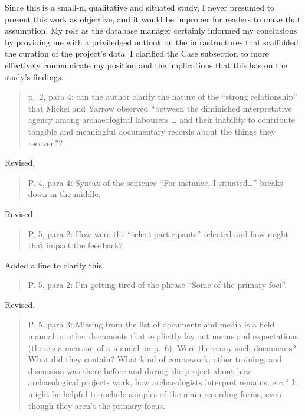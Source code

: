 \documentclass[
]{article}
\begin{document}
Since this is a small-n, qualitative and situated study, I never
presumed to present this work as objective, and it would be improper for
readers to make that assumption. My role as the database manager
certainly informed my conclusions by providing me with a priviledged
outlook on the infrastructures that scaffolded the curation of the
project's data. I clarified the Case subsection to more effectively
communicate my position and the implications that this has on the
study's findings.

\begin{quote}
p.~2, para 4: can the author clarify the nature of the ``strong
relationship'' that Mickel and Yarrow observed ``between the diminished
interpretative agency among archaeological labourers \ldots{} and their
inability to contribute tangible and meaningful documentary records
about the things they recover.''?
\end{quote}

Revised.

\begin{quote}
P. 4, para 4: Syntax of the sentence ``For instance, I
situated\ldots{}'' breaks down in the middle.
\end{quote}

Revised.

\begin{quote}
P. 5, para 2: How were the ``select participants'' selected and how
might that impact the feedback?
\end{quote}

Added a line to clarify this.

\begin{quote}
P. 5, para 2: I'm getting tired of the phrase ``Some of the primary
foci''.
\end{quote}

Revised.

\begin{quote}
P. 5, para 3: Missing from the list of documents and media is a field
manual or other documents that explicitly lay out norms and expectations
(there's a mention of a manual on p.~6). Were there any such documents?
What did they contain? What kind of coursework, other training, and
discussion was there before and during the project about how
archaeological projects work, how archaeologists interpret remains,
etc.? It might be helpful to include samples of the main recording
forms, even though they aren't the primary focus.
\end{quote}
\end{document}
